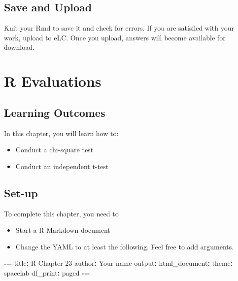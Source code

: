 \documentclass[
]{book}
\makeatletter
\newenvironment{Shaded}{\begin{snugshade}}{\end{snugshade}}
\newcommand{\NormalTok}[1]{#1}
\newcommand{\SpecialCharTok}[1]{\textcolor[rgb]{0.43,0.43,0.43}{\textbf{#1}}}
\newcommand{\StringTok}[1]{\textcolor[rgb]{0.5,0.5,0.5}{#1}}
\providecommand{\tightlist}{%
  \setlength{\itemsep}{0pt}\setlength{\parskip}{0pt}}
\newenvironment{kframe}{%
\medskip{}
\setlength{\fboxsep}{.8em}
 \def\at@end@of@kframe{}%
 \ifinner\ifhmode%
  \def\at@end@of@kframe{\end{minipage}}%
  \begin{minipage}{\columnwidth}%
 \fi\fi%
 \def\FrameCommand##1{\hskip\@totalleftmargin \hskip-\fboxsep
 \colorbox{shadecolor}{##1}\hskip-\fboxsep
     \hskip-\linewidth \hskip-\@totalleftmargin \hskip\columnwidth}%
 \MakeFramed {\advance\hsize-\width
   \@totalleftmargin\z@ \linewidth\hsize
   \@setminipage}}%
 {\par\unskip\endMakeFramed%
 \at@end@of@kframe}
\renewenvironment{Shaded}{\begin{kframe}}{\end{kframe}}
\makeatother
\begin{document}
\hypertarget{save-and-upload-6}{%
\section{Save and Upload}\label{save-and-upload-6}}

Knit your Rmd to save it and check for errors. If you are satisfied with your work, upload to eLC. Once you upload, answers will become available for download.

\hypertarget{r-evaluations}{%
\chapter{R Evaluations}\label{r-evaluations}}

\hypertarget{learning-outcomes}{%
\section{Learning Outcomes}\label{learning-outcomes}}

In this chapter, you will learn how to:

\begin{itemize}
\tightlist
\item
  Conduct a chi-square test
\item
  Conduct an independent t-test
\end{itemize}

\hypertarget{set-up-6}{%
\section{Set-up}\label{set-up-6}}

To complete this chapter, you need to

\begin{itemize}
\tightlist
\item
  Start a R Markdown document
\item
  Change the YAML to at least the following. Feel free to add arguments.
\end{itemize}

\begin{Shaded}
\begin{Highlighting}[]
\SpecialCharTok{{-}{-}{-}}
\NormalTok{title}\SpecialCharTok{:} \StringTok{\textquotesingle{}R Chapter 23\textquotesingle{}}
\NormalTok{author}\SpecialCharTok{:} \StringTok{\textquotesingle{}Your name\textquotesingle{}}
\NormalTok{output}\SpecialCharTok{:} 
\NormalTok{  html\_document}\SpecialCharTok{:}
\NormalTok{    theme}\SpecialCharTok{:}\NormalTok{ spacelab}
\NormalTok{    df\_print}\SpecialCharTok{:}\NormalTok{ paged}
\SpecialCharTok{{-}{-}{-}}
\end{Highlighting}
\end{Shaded}
\end{document}
